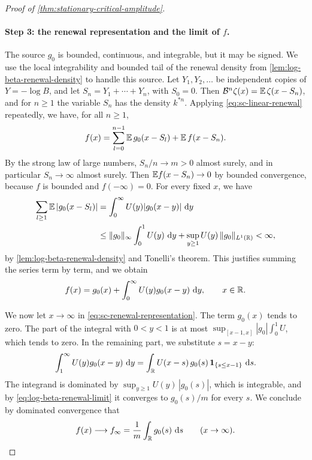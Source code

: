 \begin{proof}[Proof of \cref{thm:stationary-critical-amplitude}]
\paragraph{Step 3: the renewal representation and the limit of $f$.} The source $g_0$ is bounded, continuous, and integrable, but it may be signed. We use the local integrability and bounded tail of the renewal density from \cref{lem:log-beta-renewal-density} to handle this source. Let $Y_1,Y_2,\dots$ be independent copies of $Y=-\log B$, and let $S_n=Y_1+\cdots+Y_n$, with $S_0=0$. Then $\mathcal B^n\zeta(x)=\mathbb E\,\zeta(x-S_n)$, and for $n\ge1$ the variable $S_n$ has the density $k^{*n}$. Applying \eqref{eq:sc-linear-renewal} repeatedly, we have, for all $n\ge1$,
\[
 f(x)=\sum_{l=0}^{n-1}\mathbb E\,g_0(x-S_l)+\mathbb E\,f(x-S_n).
\]
By the strong law of large numbers, $S_n/n\to m>0$ almost surely, and in particular $S_n\to\infty$ almost surely. Then $\mathbb E f(x-S_n)\to0$ by bounded convergence, because $f$ is bounded and $f(-\infty)=0$. For every fixed $x$, we have
\begin{align*}
 \sum_{l\ge1}\mathbb E\,|g_0(x-S_l)|&=\int_0^\infty U(y)|g_0(x-y)|\,\mathop{}\!\mathrm d y\\
 &\le\|g_0\|_\infty\int_0^1U(y)\,\mathop{}\!\mathrm d y+\sup_{y\ge1}U(y)\,\|g_0\|_{L^1(\mathbb R)}<\infty,
\end{align*}
by \cref{lem:log-beta-renewal-density} and Tonelli's theorem. This justifies summing the series term by term, and we obtain
\begin{equation}
 f(x)=g_0(x)+\int_0^\infty U(y)g_0(x-y)\,\mathop{}\!\mathrm d y,\qquad x\in\mathbb R .
 \label{eq:sc-renewal-representation}
\end{equation}

We now let $x\to\infty$ in \eqref{eq:sc-renewal-representation}. The term $g_0(x)$ tends to zero. The part of the integral with $0<y<1$ is at most $\sup_{[x-1,x]}|g_0|\int_0^1U$, which tends to zero. In the remaining part, we substitute $s=x-y$:
\[
 \int_1^\infty U(y)g_0(x-y)\,\mathop{}\!\mathrm d y=\int_\mathbb R U(x-s)\,g_0(s)\,\mathbf 1_{\{s\le x-1\}}\,\mathop{}\!\mathrm d s .
\]
The integrand is dominated by $\sup_{y\ge1}U(y)\,|g_0(s)|$, which is integrable, and by \eqref{eq:log-beta-renewal-limit} it converges to $g_0(s)/m$ for every $s$. We conclude by dominated convergence that
\begin{equation}\label{eq:sc-f-limit}
 f(x)\longrightarrow f_\infty=\frac1m\int_{\mathbb R}g_0(s)\,\mathop{}\!\mathrm d s\qquad(x\to\infty).
\end{equation}


\end{proof}
